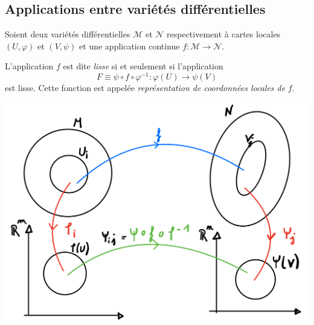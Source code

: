\subsection{Applications entre variétés différentielles}
Soient deux variétés différentielles $\mathcal{M}$ et $ \mathcal{N}$ respectivement à cartes locales $(U,\varphi)$ et $(V,\psi)$ et une application continue $f:\mathcal{M} \to \mathcal{N}$.

\begin{theoremframe}
    \begin{defi}
        L'application $f$ est dite \emph{lisse} si et seulement si l'application 
        \begin{equation}
        F \equiv \psi \circ f \circ \varphi^{-1}:\varphi(U) \to \psi(V)
        \end{equation}
        est lisse. Cette fonction est appelée \emph{représentation de coordonnées locales de} $f$.
    \end{defi}
\end{theoremframe}

\begin{center}
\includegraphics[scale=0.1]{Chapitres/3.Element de géométrie différentielle/Images/fonction de transistion.jpg}
\end{center}

